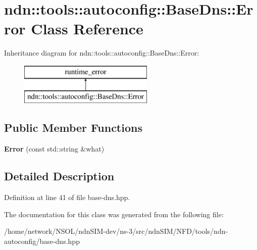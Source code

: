 \hypertarget{classndn_1_1tools_1_1autoconfig_1_1BaseDns_1_1Error}{}\section{ndn\+:\+:tools\+:\+:autoconfig\+:\+:Base\+Dns\+:\+:Error Class Reference}
\label{classndn_1_1tools_1_1autoconfig_1_1BaseDns_1_1Error}
Inheritance diagram for ndn\+:\+:tools\+:\+:autoconfig\+:\+:Base\+Dns\+:\+:Error\+:\begin{figure}[H]
\begin{center}
\leavevmode
\includegraphics[height=2.000000cm]{classndn_1_1tools_1_1autoconfig_1_1BaseDns_1_1Error}
\end{center}
\end{figure}
\subsection*{Public Member Functions}
\begin{DoxyCompactItemize}
\item 
{\bfseries Error} (const std\+::string \&what)\hypertarget{classndn_1_1tools_1_1autoconfig_1_1BaseDns_1_1Error_ac227bf8b95ed9d17245403f692d81905}{}\label{classndn_1_1tools_1_1autoconfig_1_1BaseDns_1_1Error_ac227bf8b95ed9d17245403f692d81905}

\end{DoxyCompactItemize}


\subsection{Detailed Description}


Definition at line 41 of file base-\/dns.\+hpp.



The documentation for this class was generated from the following file\+:\begin{DoxyCompactItemize}
\item 
/home/network/\+N\+S\+O\+L/ndn\+S\+I\+M-\/dev/ns-\/3/src/ndn\+S\+I\+M/\+N\+F\+D/tools/ndn-\/autoconfig/base-\/dns.\+hpp\end{DoxyCompactItemize}
